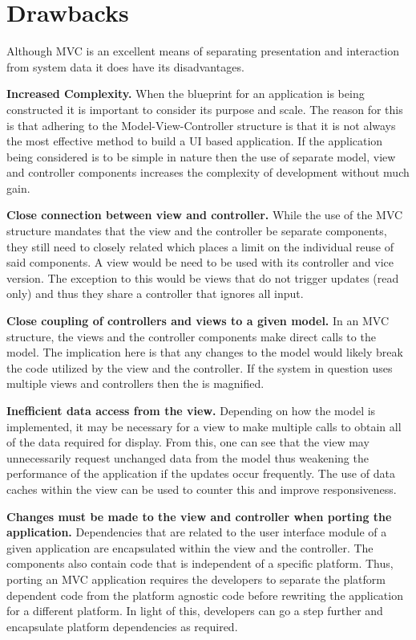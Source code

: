 \section{Drawbacks}

Although MVC is an excellent means of separating presentation and interaction from system data it
does have its disadvantages. \par

\textbf {Increased Complexity.} When the blueprint for an application is being constructed it is important to consider its purpose
and scale. The reason for this is that adhering to the Model-View-Controller
structure is that it is not always the most effective method to build a UI based application. If the application being considered is
to be simple in nature then the use of separate model, view and controller components increases the complexity of development without
much gain. \par

\textbf{Close connection between view and controller.} While the use of the MVC structure mandates that the
view and the controller be separate components, they still need to closely related which places a limit on the individual
reuse of said components. A view would be need to be used with its controller and vice version. The exception to this would be
views that do not trigger updates (read only) and thus they share a controller that ignores all input.\par

\textbf{Close coupling of controllers and views to a given model.} In an MVC structure, the views and the controller components
make direct calls to the model. The implication here is that any changes to the model would likely break the code utilized by the view and
the controller. If the system in question uses multiple views and controllers then the is magnified. \par

\textbf{Inefficient data access from the view.} Depending on how the model is implemented, it may be necessary for a view to
make multiple calls to obtain all of the data required for display. From this, one can see that the view may unnecessarily request unchanged
data from the model thus weakening the performance of the application if the updates occur frequently. The use of data caches within the view can
be used to counter this and improve responsiveness.\par

\textbf{Changes must be made to the view and controller when porting the application.} Dependencies that are related to the user interface module
of a given application are encapsulated within the view and the controller. The components also contain code that is independent of a specific platform.
Thus, porting an MVC application requires the developers to separate the platform dependent code from the platform agnostic code before rewriting
the application for a different platform. In light of this, developers can go a step further and encapsulate platform dependencies as required.\par
